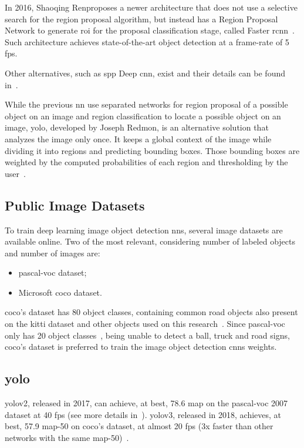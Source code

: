 In 2016, Shaoqing Ren\etal proposes a newer architecture that does not use a selective search for the region proposal algorithm, but instead has a Region Proposal Network to generate \ac{roi} for the proposal classification stage, called Faster \ac{rcnn}~\cite{Ren2017}. Such architecture achieves state-of-the-art object detection at a frame-rate of 5 \ac{fps}. 

Other alternatives, such as \ac{spp} Deep \ac{cnn}, exist and their details can be found in~\cite{He2015}.

While the previous \ac{nn} use separated networks for region proposal of a possible object on an image and region classification to locate a possible object on an image, \acf{yolo}, developed by Joseph Redmon, is an alternative solution that analyzes the image only once. It keeps a global context of the image while dividing it into regions and predicting bounding boxes. Those bounding boxes are weighted by the computed probabilities of each region and thresholding by the user~\cite{Redmon2016}. 

\subsection{Public Image Datasets}
To train deep learning image object detection \acp{nn}, several image datasets are available online. Two of the most relevant, considering number of labeled objects and number of images are:

\begin{itemize}
	\item \ac{pascal-voc} dataset;
	\item Microsoft \acf{coco} dataset.
\end{itemize}

\ac{coco}'s dataset has 80 object classes, containing common road objects also present on the \ac{kitti} dataset and other objects used on this research~\cite{Lin2014a}. Since \ac{pascal-voc} only has 20 object classes~\cite{Everingham2010}, being unable to detect a ball, truck and road signs, \ac{coco}'s dataset is preferred to train the image object detection \acp{cnn} weights.

\subsection{\acs{yolo}}
\ac{yolo}v2, released in 2017, can achieve, at best, 78.6 \ac{map} on the \ac{pascal-voc} 2007 dataset at 40 \ac{fps} (see more details in~\cite{Redmon2017}). \ac{yolo}v3, released in 2018, achieves, at best, 57.9 \ac{map}-50 on \ac{coco}'s dataset, at almost 20 \ac{fps} (3x faster than other networks with the same \ac{map}-50)~\cite{Redmon2018}.

